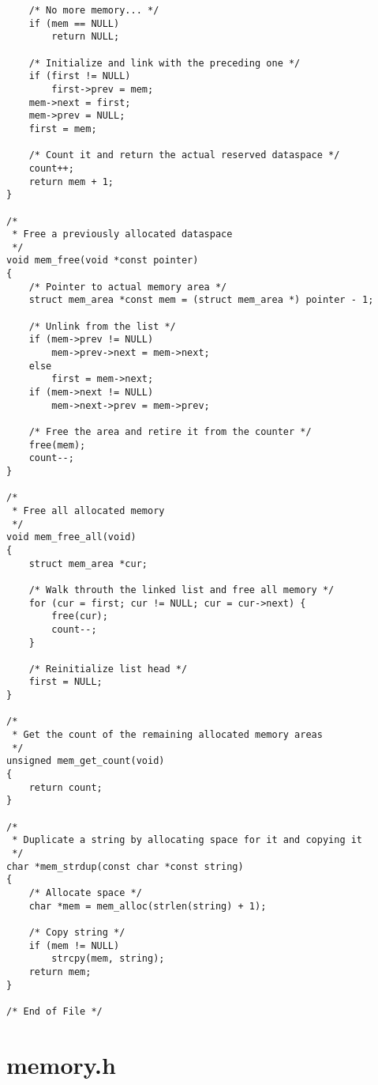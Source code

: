 \documentclass[a4paper,landscape,twocolumn,11pt]{article}
\begin{document}
\begin{lstlisting}
    /* No more memory... */
    if (mem == NULL)
        return NULL;

    /* Initialize and link with the preceding one */
    if (first != NULL)
        first->prev = mem;
    mem->next = first;
    mem->prev = NULL;
    first = mem;

    /* Count it and return the actual reserved dataspace */
    count++;
    return mem + 1;
}

/*
 * Free a previously allocated dataspace
 */
void mem_free(void *const pointer)
{
    /* Pointer to actual memory area */
    struct mem_area *const mem = (struct mem_area *) pointer - 1;

    /* Unlink from the list */
    if (mem->prev != NULL)
        mem->prev->next = mem->next;
    else
        first = mem->next;
    if (mem->next != NULL)
        mem->next->prev = mem->prev;

    /* Free the area and retire it from the counter */
    free(mem);
    count--;
}

/*
 * Free all allocated memory
 */
void mem_free_all(void)
{
    struct mem_area *cur;

    /* Walk throuth the linked list and free all memory */
    for (cur = first; cur != NULL; cur = cur->next) {
        free(cur);
        count--;
    }

    /* Reinitialize list head */
    first = NULL;
}

/*
 * Get the count of the remaining allocated memory areas
 */
unsigned mem_get_count(void)
{
    return count;
}

/*
 * Duplicate a string by allocating space for it and copying it
 */
char *mem_strdup(const char *const string)
{
    /* Allocate space */
    char *mem = mem_alloc(strlen(string) + 1);

    /* Copy string */
    if (mem != NULL)
        strcpy(mem, string);
    return mem;
}

/* End of File */
\end{lstlisting}

\bigskip\section*{memory.h}
\end{document}
